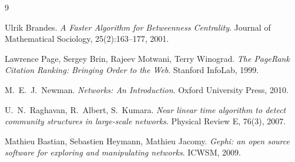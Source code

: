 \documentclass[a4paper,11pt]{article}
\begin{document}
\begin{thebibliography}{9}

  Ulrik Brandes. \emph{A Faster Algorithm for Betweenness Centrality}.
  Journal of Mathematical Sociology, 25(2):163--177, 2001.

  Lawrence Page, Sergey Brin, Rajeev Motwani, Terry Winograd.
  \emph{The PageRank Citation Ranking: Bringing Order to the Web}.
  Stanford InfoLab, 1999.

  M.\ E.\ J.\ Newman. \emph{Networks: An Introduction}.
  Oxford University Press, 2010.

  U.\ N.\ Raghavan, R.\ Albert, S.\ Kumara.
  \emph{Near linear time algorithm to detect community structures in
  large-scale networks}. Physical Review E, 76(3), 2007.

  Mathieu Bastian, Sebastien Heymann, Mathieu Jacomy.
  \emph{Gephi: an open source software for exploring and manipulating networks}.
  ICWSM, 2009.

\end{thebibliography}
\end{document}
